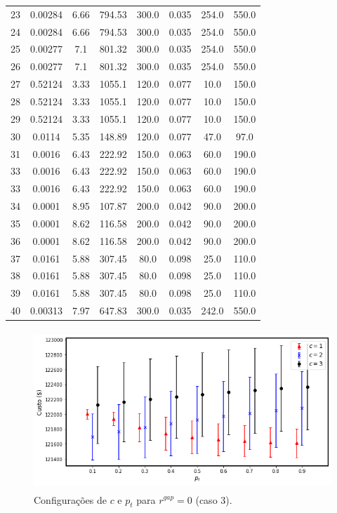\documentclass[
	12pt,				%
	openany,			%
	twoside,			%
	a4paper,			%
	chapter=TITLE,		%
	section=Title,		%
	subsection=Title,	%
	subsubsection=Title,%
	english,			%
	french,				%
	spanish,			%
	brazil			%
	]{abntex2}
\begin{document}
\begin{ERRATA}
\begin{apendicesenv}
\begin{table}[h!]
\begin{tabular}{c c c c c c c c}
23 & 0.00284 & 6.66 & 794.53 & 300.0 & 0.035 & 254.0 & 550.0 \\
24 & 0.00284 & 6.66 & 794.53 & 300.0 & 0.035 & 254.0 & 550.0 \\
25 & 0.00277 & 7.1  & 801.32 & 300.0 & 0.035 & 254.0 & 550.0 \\
26 & 0.00277 & 7.1  & 801.32 & 300.0 & 0.035 & 254.0 & 550.0 \\
27 & 0.52124 & 3.33 & 1055.1 & 120.0 & 0.077 & 10.0  & 150.0 \\
28 & 0.52124 & 3.33 & 1055.1 & 120.0 & 0.077 & 10.0  & 150.0 \\
29 & 0.52124 & 3.33 & 1055.1 & 120.0 & 0.077 & 10.0  & 150.0 \\
30 & 0.0114  & 5.35 & 148.89 & 120.0 & 0.077 & 47.0  & 97.0  \\
31 & 0.0016  & 6.43 & 222.92 & 150.0 & 0.063 & 60.0  & 190.0 \\
33 & 0.0016  & 6.43 & 222.92 & 150.0 & 0.063 & 60.0  & 190.0 \\
33 & 0.0016  & 6.43 & 222.92 & 150.0 & 0.063 & 60.0  & 190.0 \\
34 & 0.0001  & 8.95 & 107.87 & 200.0 & 0.042 & 90.0  & 200.0 \\
35 & 0.0001  & 8.62 & 116.58 & 200.0 & 0.042 & 90.0  & 200.0 \\
36 & 0.0001  & 8.62 & 116.58 & 200.0 & 0.042 & 90.0  & 200.0 \\
37 & 0.0161  & 5.88 & 307.45 & 80.0  & 0.098 & 25.0  & 110.0 \\
38 & 0.0161  & 5.88 & 307.45 & 80.0  & 0.098 & 25.0  & 110.0 \\
39 & 0.0161  & 5.88 & 307.45 & 80.0  & 0.098 & 25.0  & 110.0 \\
40 & 0.00313 & 7.97 & 647.83 & 300.0 & 0.035 & 242.0 & 550.0\\
\hline
\end{tabular}
\small{}
\end{table}


\begin{figure}[h]
    \caption{\label{rgap0_40}Configurações de $c$ e $p_t$ para $r^{gap}=0$ (caso 3).}
    \centering
    \includegraphics[width=120mm, height=60mm]{images/rgap0_40.png}
   

\end{figure}
\end{apendicesenv}
\end{ERRATA}
\end{document}
